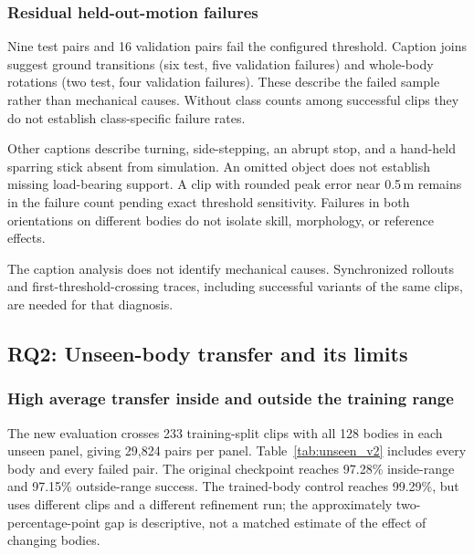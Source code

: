 \documentclass[11pt]{article}
\begin{document}
\subsubsection{Residual held-out-motion failures}\label{sec:failures}
Nine test pairs and 16 validation pairs fail the configured threshold.
Caption joins suggest ground transitions (six test, five validation failures)
and whole-body rotations (two test, four validation failures). These describe
the failed sample rather than mechanical causes. Without class counts among
successful clips they do not establish class-specific failure rates.

Other captions describe turning, side-stepping, an abrupt stop, and a hand-held
sparring stick absent from simulation. An omitted object does not establish
missing load-bearing support. A clip with rounded peak error near 0.5\,m
remains in the failure count pending exact threshold sensitivity. Failures in
both orientations on different bodies do not isolate skill, morphology, or
reference effects.

The caption analysis does not identify mechanical causes. Synchronized
rollouts and first-threshold-crossing traces, including successful variants
of the same clips, are needed for that diagnosis.

\subsection{RQ2: Unseen-body transfer and its limits}\label{sec:unseen_morphology}
\subsubsection{High average transfer inside and outside the training range}
The new evaluation crosses 233 training-split clips with all 128 bodies in
each unseen panel, giving 29,824 pairs per panel. Table~\ref{tab:unseen_v2}
includes every body and every failed pair. The original checkpoint reaches
97.28\% inside-range and 97.15\% outside-range success. The trained-body
control reaches 99.29\%, but uses different clips and a different refinement
run; the approximately two-percentage-point gap is descriptive, not a
matched estimate of the effect of changing bodies.
\end{document}
